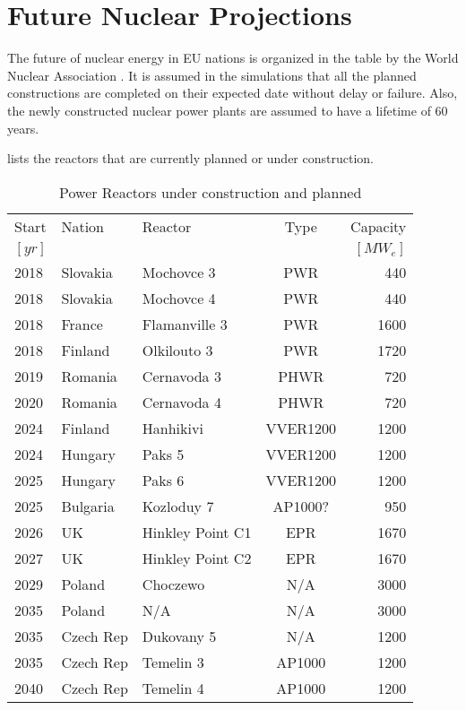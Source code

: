 \section{Future Nuclear Projections}

The future of nuclear energy in \gls{EU} nations is organized
in the table by the World Nuclear Association \cite{world_nuclear_association_nuclear_2017}.
It is assumed in the simulations that all the planned constructions 
are completed on their expected date without delay
or failure. Also, the newly constructed nuclear power plants are assumed to have a lifetime of 60 years.

 lists the reactors that are currently  planned or under construction.

 
\begin{table}[h]
	\centering
	\caption {Power Reactors under construction and planned \cite{world_nuclear_association_nuclear_2017}}
	\label{tab:eu_deployment}
	\begin{tabular}{lllcr}
		\hline
		Start & Nation & Reactor & Type & Capacity\\
                $[yr]$ & & & & $[MW_e]$\\
		\hline
		2018 & Slovakia  & Mochovce 3 & PWR & 440\\
		2018 & Slovakia & Mochovce 4 & PWR & 440 \\
		2018 & France & Flamanville 3 & PWR & 1600 \\
		2018 & Finland & Olkilouto 3 & PWR & 1720 \\		
		2019 & Romania & Cernavoda 3 & PHWR & 720 \\
		2020 & Romania & Cernavoda 4 & PHWR & 720 \\
		2024 & Finland & Hanhikivi & VVER1200 & 1200 \\
		2024 & Hungary & Paks 5 & VVER1200 & 1200 \\
		2025 & Hungary & Paks 6 & VVER1200 & 1200 \\
		2025 & Bulgaria & Kozloduy 7 & AP1000? & 950 \\
		2026 & UK & Hinkley Point C1 & EPR & 1670 \\
		2027 & UK & Hinkley Point C2 & EPR & 1670 \\
		2029 & Poland & Choczewo & N/A & 3000 \\
		2035 & Poland & N/A & N/A & 3000 \\
		2035 & Czech Rep & Dukovany 5 & N/A & 1200 \\
		2035 & Czech Rep & Temelin 3 & AP1000 & 1200 \\
		2040 & Czech Rep & Temelin 4 & AP1000 & 1200 \\
		\hline
	\end{tabular}
\end{table}
\FloatBarrier

